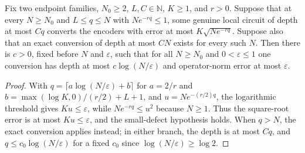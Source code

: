 \begin{lemma}
    \label{thm:ldp_sector_all_accuracy_compilation}
    \leanok
    Fix two endpoint families, $N_0\ge2$, $L,C\in\mathbb N$, $K\ge1$,
    and $r>0$. Suppose that at every $N\ge N_0$ and $L\le q\le N$ with
    $Ne^{-rq}\le1$, some genuine local circuit of depth at most $Cq$
    converts the encoders with error at most $K\sqrt{Ne^{-rq}}$.
    Suppose also that an exact conversion of depth at most $CN$ exists
    for every such $N$. Then there is $c>0$, fixed before $N$ and
    $\varepsilon$, such that for all $N\ge N_0$ and $0<\varepsilon\le1$
    one conversion has depth at most $c\log(N/\varepsilon)$ and
    operator-norm error at most $\varepsilon$.
\end{lemma}
\begin{proof}\leanok
    With $q=\lceil a\log(N/\varepsilon)+b\rceil$ for $a=2/r$ and
    $b=\max(\log K,0)/(r/2)+L+1$, and $u=Ne^{-(r/2)q}$,
    the logarithmic threshold gives $Ku\le\varepsilon$, while
    $Ne^{-rq}\le u^2$ because $N\ge1$. Thus the square-root error is
    at most $Ku\le\varepsilon$, and the small-defect hypothesis holds.
    When $q>N$, the exact conversion applies instead; in either branch, the depth is
    at most $Cq$, and $q\le c_0\log(N/\varepsilon)$ for a fixed $c_0$
    since $\log(N/\varepsilon)\ge\log2$.
\end{proof}

